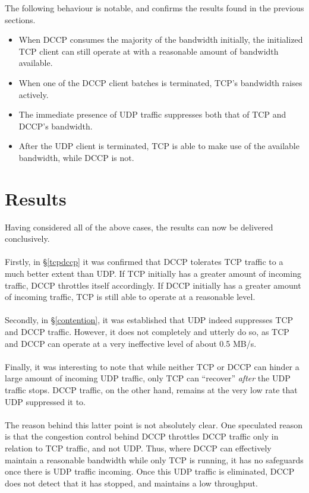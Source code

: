 \documentclass[10pt,a4paper]{article}
\begin{document}
The following behaviour is notable, and confirms the results found in the
previous sections.

\begin{itemize}
 \item When DCCP consumes the majority of the bandwidth initially, the
initialized TCP client can still operate at with a reasonable amount of
bandwidth available.
 \item When one of the DCCP client batches is terminated, TCP's bandwidth
raises actively.
 \item The immediate presence of UDP traffic suppresses both that of TCP and
DCCP's bandwidth.
 \item After the UDP client is terminated, TCP is able to make use of the
available bandwidth, while DCCP is not. 
\end{itemize}


\section{Results}

Having considered all of the above cases, the results can now be delivered
conclusively.
\paragraph{}
Firstly, in \S\ref{tcpdccp} it was confirmed that DCCP tolerates TCP traffic to
a
much better extent than UDP. If TCP initially has a greater amount of incoming
traffic, DCCP throttles itself accordingly. If DCCP initially has a greater
amount of incoming traffic, TCP is still able to operate at a reasonable level.
\paragraph{}
Secondly, in \S\ref{contention}, it was established that UDP indeed suppresses
TCP and DCCP traffic. However, it does not completely and utterly do so, as
TCP and DCCP can operate at a very ineffective level of about 0.5 MB/s. 
\paragraph{}
Finally, it was interesting to note that while neither TCP or DCCP can hinder a
large amount of incoming UDP traffic, only TCP can ``recover'' \emph{after} the
UDP traffic stops. DCCP traffic, on the other hand, remains at the very low
rate that UDP suppressed it to.
\paragraph{}
The reason behind this latter point is not absolutely clear. One speculated
reason is that the congestion control behind DCCP throttles DCCP traffic only
in relation to TCP traffic, and not UDP. Thus, where DCCP can effectively
maintain a reasonable bandwidth while only TCP is running, it has no safeguards
once there is UDP traffic incoming. Once this UDP traffic is eliminated, DCCP
does not detect that it has stopped, and maintains a low throughput.
\end{document}

